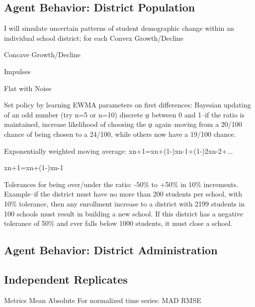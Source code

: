 \documentclass{article}
\begin{document}
\subsection*{Agent Behavior: District Population}
I will simulate uncertain patterns of student demographic change within an individual school district; for each Convex Growth/Decline
		


	
	Concave Growth/Decline
		
		

	Impulses 
		

	Flat with Noise

		
Set policy by learning EWMA parameters on first differences: Bayesian updating of an odd number (try n=5 or n=10) discrete ⍶ between 0 and 1–if the ratio is maintained, increase likelihood of choosing the ⍶ again–moving from a 20/100 chance of being chosen to a 24/100, while others now have a 19/100 chance.

	Exponentially weighted moving average: x{n+1}=x{n}+(1-)x{n-1}+(1-)2x{n-2}+... 

x{n+1}=x{n}+(1-)x{n-1}

Tolerances  for being over/under the ratio: -50\% to +50\% in 10\% increments. Example–if the district must have no more than 200 students per school, with 10\% tolerance, then any enrollment increase to a district with 2199 students in 100 schools  must result in building a new school. If this district has a negative tolerance of 50\% and  ever falls below 1000 students, it must close a school.


\subsection*{Agent Behavior: District Administration}
\cite{snyder1999understanding}
\cite{fogel1999inductive}
\subsection*{Independent Replicates}


Metrics
Mean Absolute %
For normalized time series:
MAD 	
RMSE

\medskip

\printbibliography
\end{document}
